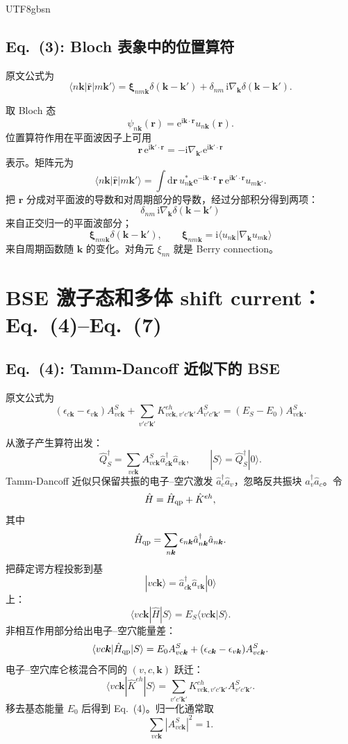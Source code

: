 \documentclass[11pt,a4paper]{article}
\newcommand{\dd}{\mathrm{d}}
\newcommand{\ii}{\mathrm{i}}
\newcommand{\ee}{\mathrm{e}}
\begin{document}
\begin{CJK}{UTF8}{gbsn}
\subsection*{Eq.~(3): Bloch 表象中的位置算符}

原文公式为
\begin{equation}
\langle n\bm k|\hat{\bm r}|m\bm k'\rangle
=\bm \xi_{nm\bm k}\delta(\bm k-\bm k')
+\delta_{nm}\,\ii\nabla_{\bm k}\delta(\bm k-\bm k').
\tag{3}
\end{equation}

取 Bloch 态
\[
\psi_{n\bm k}(\bm r)=\ee^{\ii\bm k\cdot\bm r}u_{n\bm k}(\bm r).
\]
位置算符作用在平面波因子上可用
\[
\bm r\,\ee^{\ii\bm k'\cdot\bm r}
=-\ii\nabla_{\bm k'}\ee^{\ii\bm k'\cdot\bm r}
\]
表示。矩阵元为
\[
\langle n\bm k|\hat{\bm r}|m\bm k'\rangle
=\int \dd \bm r\,
u^*_{n\bm k}\ee^{-\ii\bm k\cdot\bm r}\,
\bm r\,\ee^{\ii\bm k'\cdot\bm r}u_{m\bm k'}.
\]
把 $\bm r$ 分成对平面波的导数和对周期部分的导数，经过分部积分得到两项：
\[
\delta_{nm}\,\ii\nabla_{\bm k}\delta(\bm k-\bm k')
\]
来自正交归一的平面波部分；
\[
\bm \xi_{nm\bm k}\delta(\bm k-\bm k'),
\qquad
\bm\xi_{nm\bm k}
=\ii\langle u_{n\bm k}|\nabla_{\bm k}u_{m\bm k}\rangle
\]
来自周期函数随 $\bm k$ 的变化。对角元 $\xi_{nn}$ 就是 Berry connection。

\section{BSE 激子态和多体 shift current：Eq.~(4)--Eq.~(7)}

\subsection*{Eq.~(4): Tamm-Dancoff 近似下的 BSE}

原文公式为
\begin{equation}
(\epsilon_{c\bm k}-\epsilon_{v\bm k})A^S_{vc\bm k}
+\sum_{v'c'\bm k'}
K^{eh}_{vc\bm k,v'c'\bm k'}A^S_{v'c'\bm k'}
=(E_S-E_0)A^S_{vc\bm k}.
\tag{4}
\end{equation}

从激子产生算符出发：
\[
\hat Q^\dagger_S
=\sum_{vc\bm k}A^S_{vc\bm k}
\hat a^\dagger_{c\bm k}\hat a_{v\bm k},
\qquad
|S\rangle=\hat Q^\dagger_S|0\rangle.
\]
Tamm-Dancoff 近似只保留共振的电子--空穴激发
$\hat a^\dagger_c\hat a_v$，忽略反共振块
$\hat a^\dagger_v\hat a_c$。令
\[
\hat H=\hat H_{\rm qp}+\hat K^{eh},
\]
其中
\[
\hat H_{\rm qp}
=\sum_{n\bm k}\epsilon_{n\bm k}
\hat a^\dagger_{n\bm k}\hat a_{n\bm k}.
\]
把薛定谔方程投影到基
\[
|vc\bm k\rangle
=\hat a^\dagger_{c\bm k}\hat a_{v\bm k}|0\rangle
\]
上：
\[
\langle vc\bm k|\hat H|S\rangle
=E_S\langle vc\bm k|S\rangle.
\]
非相互作用部分给出电子--空穴能量差：
\[
\langle vc\bm k|\hat H_{\rm qp}|S\rangle
=E_0A^S_{vc\bm k}
+(\epsilon_{c\bm k}-\epsilon_{v\bm k})A^S_{vc\bm k}.
\]
电子--空穴库仑核混合不同的 $(v,c,\bm k)$ 跃迁：
\[
\langle vc\bm k|\hat K^{eh}|S\rangle
=\sum_{v'c'\bm k'}
K^{eh}_{vc\bm k,v'c'\bm k'}A^S_{v'c'\bm k'}.
\]
移去基态能量 $E_0$ 后得到 Eq.~(4)。归一化通常取
\[
\sum_{vc\bm k}|A^S_{vc\bm k}|^2=1.
\]


\end{CJK}
\end{document}

